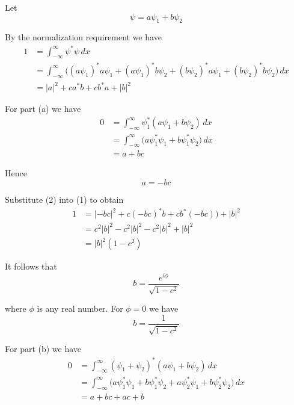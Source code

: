 


Let
\begin{equation*}
\psi=a\psi_1+b\psi_2
\end{equation*}

By the normalization requirement we have
\begin{align*}
1&=\int_{-\infty}^\infty\psi^*\psi\,dx
\\
&=\int_{-\infty}^\infty
\bigl(
(a\psi_1)^*a\psi_1
+(a\psi_1)^*b\psi_2
+(b\psi_2)^*a\psi_1
+(b\psi_2)^*b\psi_2
\bigr)\,dx
\\
&=|a|^2+ca^*b+cb^*a+|b|^2\tag{1}
\end{align*}

For part (a) we have
\begin{align*}
0&=\int_{-\infty}^\infty
\psi_1^*(a\psi_1+b\psi_2)\,dx
\\
&=\int_{-\infty}^\infty
\bigl(
a\psi_1^*\psi_1+b\psi_1^*\psi_2
\bigr)\,dx
\\
&=a+bc
\end{align*}

Hence
\begin{equation*}
a=-bc
\tag{2}
\end{equation*}

Substitute (2) into (1) to obtain
\begin{align*}
1&=|{-bc}|^2+c(-bc)^*b+cb^*(-bc))+|b|^2
\\
&=c^2|b|^2-c^2|b|^2-c^2|b|^2+|b|^2
\\
&=|b|^2(1-c^2)
\end{align*}

It follows that
\begin{equation*}
b=\frac{e^{i\phi}}{\sqrt{1-c^2}}
\end{equation*}

where $\phi$ is any real number.
For $\phi=0$ we have
\begin{equation*}
b=\frac{1}{\sqrt{1-c^2}}
\end{equation*}

For part (b) we have
\begin{align*}
0&=\int_{-\infty}^\infty
(\psi_1+\psi_2)^*(a\psi_1+b\psi_2)\,dx
\\
&=\int_{-\infty}^\infty
\bigl(
a\psi_1^*\psi_1
+b\psi_1^*\psi_2
+a\psi_2^*\psi_1
+b\psi_2^*\psi_2
\bigr)\,dx
\\
&=a+bc+ac+b
\end{align*}

